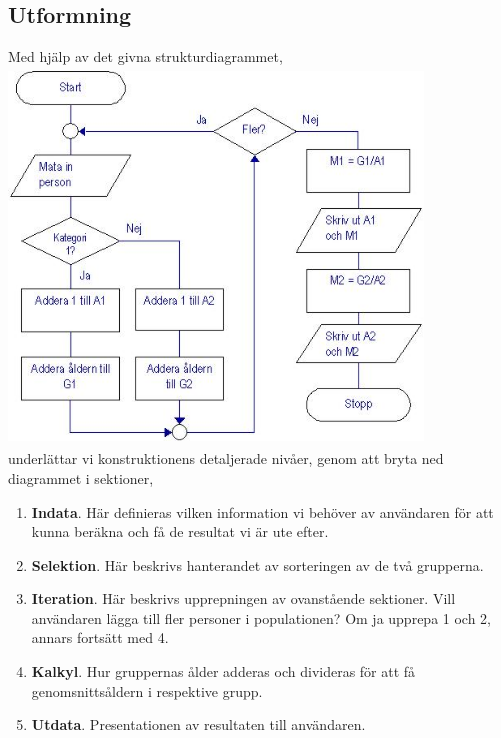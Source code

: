 \documentclass[../main.tex]{subfiles}
\begin{document}
\subsection{Utformning}

Med hjälp av det givna strukturdiagrammet,\\

\includegraphics[width=11cm, height=10cm]{Projekt/Genomsnitt/figs/strukturdiagram.jpg}
\\
underlättar vi konstruktionens detaljerade nivåer, genom att bryta ned diagrammet i sektioner,

\begin{tcolorbox}[colback=gray!5!white,colframe=black!75!black]

\begin{enumerate}

    \item \textbf{Indata}. Här definieras vilken information vi behöver av användaren för att kunna beräkna och få de resultat vi är ute efter.
    
    \item \textbf{Selektion}. Här beskrivs hanterandet av sorteringen av de två grupperna. 
    
    \item \textbf{Iteration}. Här beskrivs upprepningen av ovanstående sektioner.
    Vill användaren lägga till fler personer i populationen? Om ja upprepa 1 och 2, annars fortsätt med 4.
    
    \item \textbf{Kalkyl}. Hur gruppernas ålder adderas och divideras för att få genomsnittsåldern i respektive grupp.
    
    \item \textbf{Utdata}. Presentationen av resultaten till användaren.
    
\end{enumerate}

\end{tcolorbox}

\newpage
\end{document}
